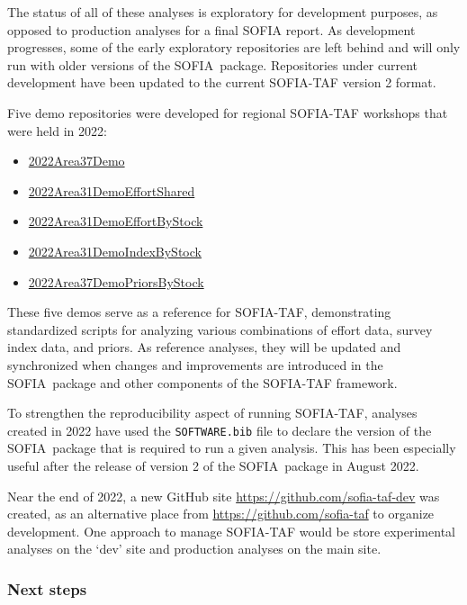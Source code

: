 \documentclass[12pt]{article}
\newcommand\blue[1]{\textcolor{darkblue}{#1}}
\newcommand\SOFIA{{\sf SOFIA}}
\newcommand\sofialink[2]{\blue{\href{https://github.com/sofia-taf/#1}{\sf #2}}}
\begin{document}
The status of all of these analyses is exploratory for development purposes, as
opposed to production analyses for a final SOFIA report. As development
progresses, some of the early exploratory repositories are left behind and will
only run with older versions of the \SOFIA\ package. Repositories under current
development have been updated to the current SOFIA-TAF version 2 format.

Five demo repositories were developed for regional SOFIA-TAF workshops that were
held in 2022:

\begin{itemize}
  \item \sofialink{2022Area37Demo}{2022Area37Demo}
  \item \sofialink{2022Area31DemoEffortShared}{2022Area31DemoEffortShared}
  \item \sofialink{2022Area31DemoEffortByStock}{2022Area31DemoEffortByStock}
  \item \sofialink{2022Area31DemoIndexByStock}{2022Area31DemoIndexByStock}
  \item \sofialink{2022Area37DemoPriorsByStock}{2022Area37DemoPriorsByStock}
\end{itemize}

\newpage

These five demos serve as a reference for SOFIA-TAF, demonstrating standardized
scripts for analyzing various combinations of effort data, survey index data,
and priors. As reference analyses, they will be updated and synchronized when
changes and improvements are introduced in the \SOFIA\ package and other
components of the SOFIA-TAF framework.

To strengthen the reproducibility aspect of running SOFIA-TAF, analyses created
in 2022 have used the \verb|SOFTWARE.bib| file to declare the version of the
\SOFIA\ package that is required to run a given analysis. This has been
especially useful after the release of version 2 of the \SOFIA\ package in
August 2022.

Near the end of 2022, a new GitHub site
\blue{\url{https://github.com/sofia-taf-dev}} was created, as an alternative
place from \blue{\url{https://github.com/sofia-taf}} to organize development.
One approach to manage SOFIA-TAF would be store experimental analyses on the
`dev' site and production analyses on the main site.

\subsubsection{Next steps}
\label{subsubsec:repos-next-steps}
\end{document}
